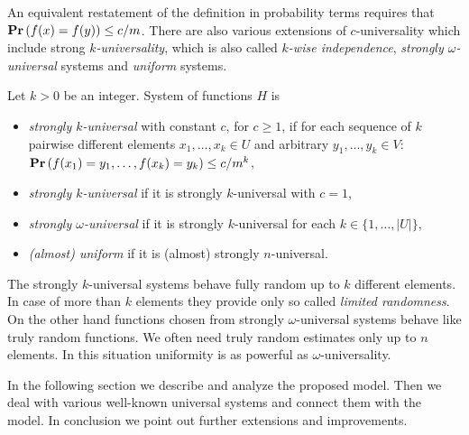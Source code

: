 An equivalent restatement of the definition in probability terms requires that $\mathbf{Pr}\left(f(x) = f(y)\right) \leq c/m$. There are also various extensions of $c$-universality which include strong \emph{$k$-universality}\cite{DBLP:conf/focs/WegmanC79}, which is also called \emph{$k$-wise independence}\cite{DBLP:conf/focs/WegmanC79}, \emph{strongly $\omega$-universal}\cite{DBLP:conf/focs/WegmanC79} systems and \emph{uniform}\cite{DBLP:journals/siamcomp/PaghP08} systems.
\begin{definition}
Let $k > 0$ be an integer. System of functions $H$ is
\begin{itemize}
	\item \emph{strongly $k$-universal} with constant $c$, for $c \geq 1$, if for each sequence of $k$ pairwise different elements $x_1, \dots, x_k \in U$ and arbitrary $y_1, \dots, y_k \in V$: $\mathbf{Pr}\left(f(x_1) = y_1, \dots, f(x_k) = y_k\right) \leq {c}/{m^k}$,
	\item \emph{strongly $k$-universal} if it is strongly $k$-universal with $c = 1$,
	\item \emph{strongly $\omega$-universal} if it is strongly $k$-universal for each $k \in \{1, \dots, |U|\}$,
	\item \emph{(almost) uniform} if it is (almost) strongly $n$-universal.
\end{itemize}
\end{definition}

The strongly $k$-universal systems behave fully random up to $k$ different elements. 
In case of more than $k$ elements they provide only so called \emph{limited randomness}. 
On the other hand functions chosen from strongly $\omega$-universal systems behave like truly random functions. 
We often need truly random estimates only up to $n$ elements.
In this situation uniformity is as powerful as $\omega$-universality.

In the following section we describe and analyze the proposed model. 
Then we deal with various well-known universal systems and connect them with the model. 
In conclusion we point out further extensions and improvements.
